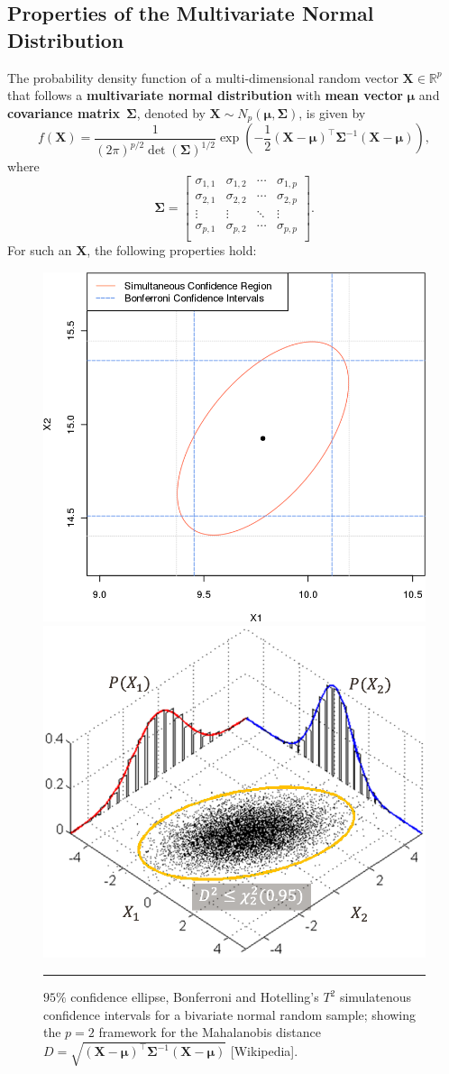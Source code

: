 \subsection{Properties of the Multivariate Normal Distribution}
The probability density function of a multi-dimensional random vector $\mathbf{X}\in\mathbb{R}^p$ that follows a \textbf{multivariate normal distribution} with \textbf{mean vector} $\bm{\mu}$ and \textbf{covariance matrix}~$\bm{\Sigma}$, denoted by $\bm{X}\sim N_p(\bm{\mu},\bm{\Sigma})$, is given by 
$$
f(\bm{X})=\frac{1}{(2\pi)^{p/2}\det(\bm{\Sigma})^{1/2}}\exp\left(-\frac{1}{2}(\bm{X}-\bm{\mu})^{\!\top}\bm{\Sigma}^{-1}(\bm{X}-\bm{\mu})\right),
$$
where
$$
    \bm{\Sigma}=
    \begin{bmatrix}
    \sigma_{1,1} & \sigma_{1,2} & \cdots & \sigma_{1,p}\\
    \sigma_{2,1} & \sigma_{2,2} & \cdots & \sigma_{2,p}\\
    \vdots & \vdots &  \ddots & \vdots\\
    \sigma_{p,1} & \sigma_{p,2} & \cdots & \sigma_{p,p}\\
    \end{bmatrix}.  
$$
For such an $\bm{X}$, the following properties hold: \begin{figure}[t]
\centering
   \includegraphics[width=0.40\linewidth]{Images/testA7.png}\quad 
   \includegraphics[width=0.44\linewidth]{Images/multivariate.png}

  \caption[\small Confidence regions (red), Bonferroni (blue) and Hotelling (grey) simultaneous confidence intervals]{\small $95\%$ confidence ellipse, Bonferroni and Hotelling's ${T}^{2}$ simulatenous confidence intervals for a bivariate normal random sample; showing the  $p=2$ framework for the Mahalanobis distance $D=\sqrt{(\bm{X}-\bm{\mu})^{\!\top}\bm{\Sigma}^{-1}(\bm{X}-\bm{\mu})}$ [Wikipedia]. }
  \label{fig:testA7}\hrule
\end{figure}
